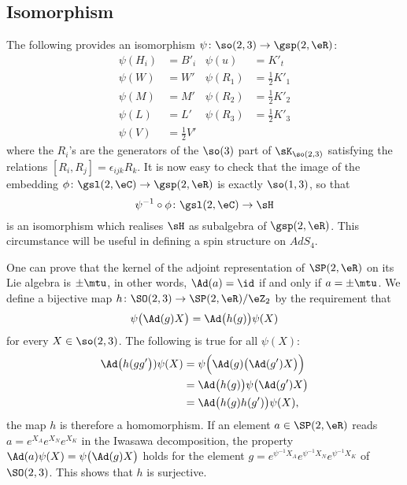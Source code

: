 \subsection{Isomorphism}		\label{SubSecIsosp}

The following provides an isomorphism $\psi\colon \so(2,3)\to \gsp(2,\eR)$:
\begin{align*}
\psi(H_i)&=B'_i		&\psi(u)&=K'_t\\
\psi(W)&=W'		&\psi(R_1)&=\frac{ 1 }{2}K'_1\\
\psi(M)&=M'		&\psi(R_2)&=\frac{ 1 }{2}K'_2\\
\psi(L)&=L'		&\psi(R_3)&=\frac{ 1 }{2}K'_3\\
\psi(V)&=\frac{ 1 }{2}V'
\end{align*}
where the $R_i$'s are the generators of the $\so(3)$ part of $\sK_{\so(2,3)}$ satisfying the relations $[R_i,R_j]=\epsilon_{ijk}R_k$. It is now easy to check that the image of the embedding $\phi\colon \gsl(2,\eC) \to \gsp(2,\eR)$ is exactly $\so(1,3)$, so that
\begin{equation}
\psi^{-1}\circ\phi\colon \gsl(2,\eC)\to \sH
\end{equation}
is an isomorphism which realises $\sH$ as subalgebra of $\gsp(2,\eR)$. This circumstance will be useful in defining a spin structure on $AdS_4$.

One can prove that the kernel of the adjoint representation of $\SP(2,\eR)$ on its Lie algebra is $\pm\mtu$, in other words, $\Ad(a)=\id$ if and only if $a=\pm\mtu$. We define a bijective map $h\colon \SO(2,3)\to \SP(2,\eR)/\eZ_2$ by the requirement that
\begin{equation}		\label{Eqdefhspsl}
  \psi\big( \Ad(g)X \big)=\Ad\big( h(g) \big)\psi(X)
\end{equation}
for every $X\in\so(2,3)$. The following is true for all $\psi(X)$:
\[ 
\begin{split}
\Ad\big(h(gg'\big)) \psi(X)&=\psi\Big( \Ad(g)\big( \Ad(g')X \big) \Big)\\
			&=\Ad\big( h(g) \big)\psi\big( \Ad(g')X \big)\\
			&=\Ad\big( h(g)h(g') \big)\psi(X),
\end{split}
\]
 the map $h$ is therefore a homomorphism. If an element $a\in \SP(2,\eR)$ reads $a= e^{X_A} e^{X_N} e^{X_K}$ in the Iwasawa decomposition, the property $\Ad(a)\psi(X)=\psi\big( \Ad(g)X \big)$ holds for the element\label{PgSolhpsiSP} $g= e^{\psi^{-1}X_A} e^{\psi^{-1}X_N} e^{\psi^{-1}X_K}$ of $\SO(2,3)$. This shows that $h$ is surjective.

